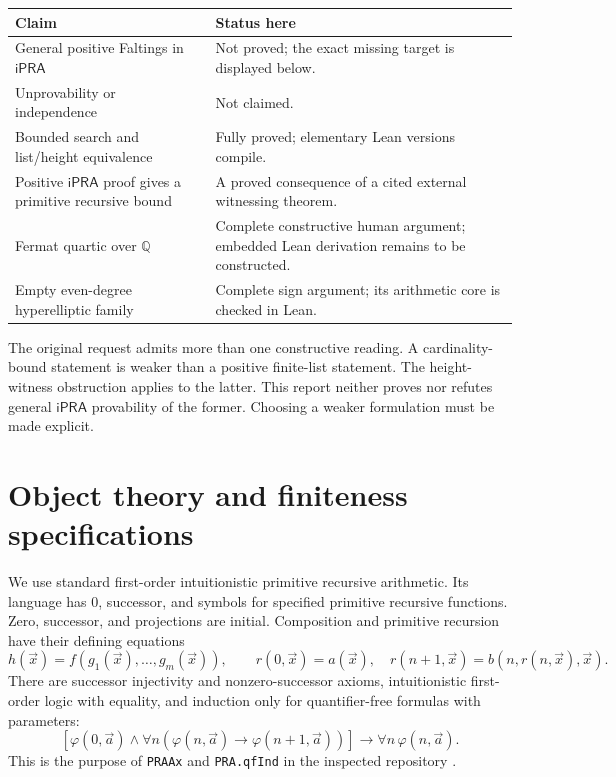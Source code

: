 \documentclass[11pt,letterpaper]{article}
\newcommand{\iPRA}{\mathsf{iPRA}}
\newcommand{\Q}{\mathbb Q}
\theoremstyle{definition}
\begin{document}
\begin{center}
\begin{tabularx}{\textwidth}{@{}p{}X@{}}
\toprule
Claim & Status here\\ \midrule
General positive Faltings in $\iPRA$ & Not proved; the exact missing target is displayed below.\\
Unprovability or independence & Not claimed.\\
Bounded search and list/height equivalence & Fully proved; elementary Lean versions compile.\\
Positive $\iPRA$ proof gives a primitive recursive bound & A proved consequence of a cited external witnessing theorem.\\
Fermat quartic over $\Q$ & Complete constructive human argument; embedded Lean derivation remains to be constructed.\\
Empty even-degree hyperelliptic family & Complete sign argument; its arithmetic core is checked in Lean.\\
\bottomrule
\end{tabularx}
\end{center}

The original request admits more than one constructive reading.
A cardinality-bound statement is weaker than a positive finite-list
statement. The height-witness obstruction applies to the latter.
This report neither proves nor refutes general $\iPRA$ provability of
the former. Choosing a weaker formulation must be made explicit.

\section{Object theory and finiteness specifications}
\label{sec:setting}
We use standard first-order intuitionistic primitive recursive arithmetic.
Its language has $0$, successor, and symbols for specified primitive
recursive functions. Zero, successor, and projections are initial.
Composition and primitive recursion have their defining equations
\[
 h(\vec x)=f(g_1(\vec x),\ldots,g_m(\vec x)),\qquad
 r(0,\vec x)=a(\vec x),\quad
 r(n+1,\vec x)=b(n,r(n,\vec x),\vec x).
\]
There are successor injectivity and nonzero-successor axioms, intuitionistic
first-order logic with equality, and induction only for quantifier-free
formulas with parameters:
\[
 [\varphi(0,\vec a)\wedge
 \forall n(\varphi(n,\vec a)\to\varphi(n+1,\vec a))]
 \to\forall n\,\varphi(n,\vec a).                         \tag{I}
\]
This is the purpose of \texttt{PRAAx} and \texttt{PRA.qfInd} in the
inspected repository \cite{Repo}.
\end{document}

